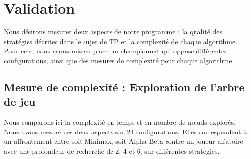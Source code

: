 \chapter{Validation}
\label{ch:validation}
Nous désirons mesurer deux aspects de notre programme : la qualité des stratégies décrites dans le sujet de \ac{TP} et la complexité de chaque algorithme. Pour cela, nous avons mis en place un championnat qui oppose différentes configurations, ainsi que des mesures de complexité pour chaque algorithme. 


\section{Mesure de complexité : Exploration de l'arbre de jeu}
\label{sec:game_tree_exploration}
Nous comparons ici la complexité en temps et en nombre de nœuds explorés. Nous avons mesuré ces deux aspects sur 24 configurations. Elles correspondent à un affrontement entre soit Minimax, soit Alpha-Beta contre un joueur aléatoire avec une profondeur de recherche de 2, 4 et 6, sur différentes stratégies.


